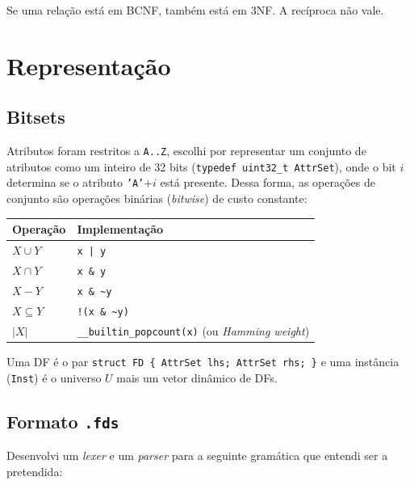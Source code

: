 \documentclass[11pt,a4paper]{article}
\newcommand{\cmd}[1]{\texttt{#1}}
\begin{document}
Se uma relação está em BCNF, também está em 3NF. A recíproca não vale.






\section{Representação}

\subsection{Bitsets}

Atributos foram restritos a \texttt{A..Z}, escolhi por representar um conjunto de atributos
como um inteiro de 32 bits (\cmd{typedef uint32\_t AttrSet}), onde o bit $i$ determina se o
atributo \texttt{'A'}$+i$ está presente. Dessa forma, as operações de conjunto são operações
binárias (\textit{bitwise}) de custo constante:

\begin{center}
    \begin{tabular}{ll}
        \toprule
        Operação & Implementação \\
        \midrule
        $X \cup Y$ & \cmd{x | y} \\
        $X \cap Y$ & \cmd{x \& y} \\
        $X - Y$ & \cmd{x \& \textasciitilde y} \\
        $X \subseteq Y$ & \cmd{!(x \& \textasciitilde y)} \\
        $|X|$ & \cmd{\_\_builtin\_popcount(x)} (ou \emph{Hamming weight}) \\
        \bottomrule
    \end{tabular}
\end{center}

Uma DF é o par \cmd{struct FD \{ AttrSet lhs; AttrSet rhs; \}} e uma
instância (\cmd{Inst}) é o universo $U$ mais um vetor dinâmico de DFs.

\subsection{Formato \texttt{.fds}}

Desenvolvi um \textit{lexer} e um \textit{parser} para a seguinte
gramática que entendi ser a pretendida:
\end{document}
